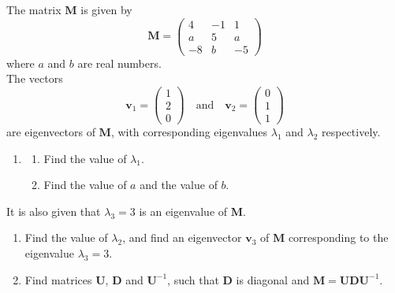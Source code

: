 \documentclass[leqno]{article}
\begin{document}
\begin{enumerate}[
  label=\textbf{\arabic*.},
  leftmargin=*,
  topsep=0pt,
  partopsep=0pt,
  parsep=0pt
]
\begin{djsSolution}
\begin{enumerate}[label=\textbf{(\alph*)}, start=1]
\end{enumerate}
\end{djsSolution}

\newpage

\questionitem

The matrix $\mathbf{M}$ is given by
\[\mathbf{M} = \begin{pmatrix} 4 & -1 & 1 \\ a & 5 & a \\ -8 & b & -5 \end{pmatrix}\]
where $a$ and $b$ are real numbers. \\

The vectors
\[\mathbf{v}_1 = \begin{pmatrix} 1 \\ 2 \\ 0 \end{pmatrix} \quad \text{and} \quad \mathbf{v}_2 = \begin{pmatrix} 0 \\ 1 \\ 1 \end{pmatrix}\]
are eigenvectors of $\mathbf{M}$, with corresponding eigenvalues $\lambda_1$ and $\lambda_2$ respectively. \\

\begin{enumerate}[label=\textbf{(\alph*)}]
  \item
  \begin{enumerate}[label=(\roman*)]
    \item Find the value of $\lambda_1$. 
    \item Find the value of $a$ and the value of $b$.  \\
  \end{enumerate}
\end{enumerate}
It is also given that $\lambda_3 = 3$ is an eigenvalue of $\mathbf{M}$. \\
\begin{enumerate}[label=\textbf{(\alph*)}, resume]
  \item Find the value of $\lambda_2$, and find an eigenvector $\mathbf{v}_3$ of $\mathbf{M}$ corresponding to the eigenvalue $\lambda_3 = 3$.  \\
  \item Find matrices $\mathbf{U}$, $\mathbf{D}$ and $\mathbf{U}^{-1}$, such that $\mathbf{D}$ is diagonal and $\mathbf{M} = \mathbf{U}\mathbf{D}\mathbf{U}^{-1}$.  \\
\end{enumerate}


\end{enumerate}
\end{document}
